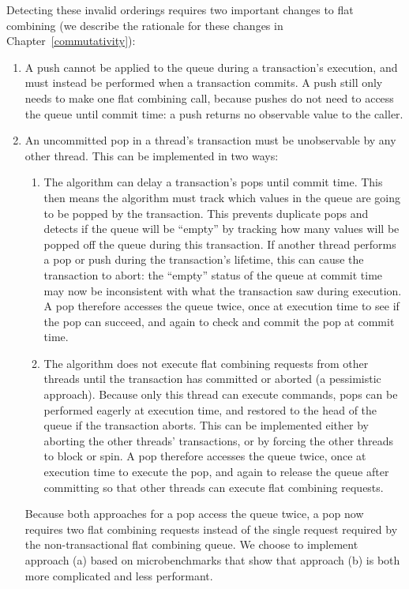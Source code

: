 Detecting these invalid orderings requires two important changes to flat combining (we describe the rationale for these changes in Chapter~\ref{commutativity}): 
\begin{enumerate}
    \item A push cannot be applied to the queue during a transaction's execution, and must instead be performed when a transaction commits. A push still only needs to make one flat combining call, because pushes do not need to access the queue until commit time: a push returns no observable value to the caller.
\item An uncommitted pop in a thread's transaction must be unobservable by any other thread. This can be implemented in two ways:  
    \begin{enumerate}
        \item The algorithm can delay a transaction's pops until commit time. This then means the algorithm must track which values in the queue are going to be popped by the transaction. This prevents duplicate pops and detects if the queue will be ``empty'' by tracking how many values will be popped off the queue during this transaction. If another thread performs a pop or push during the transaction's lifetime, this can cause the transaction to abort: the ``empty'' status of the queue at commit time may now be inconsistent with what the transaction saw during execution. 
        A pop therefore accesses the queue twice, once at execution time to see if the pop can succeed, and again to check and commit the pop at commit time. 
        \item The algorithm does not execute flat combining requests from other threads until the transaction has committed or aborted (a pessimistic approach). Because only this thread can execute commands, pops can be performed eagerly at execution time, and restored to the head of the queue if the transaction aborts. This can be implemented either by aborting the other threads' transactions, or by forcing the other threads to block or spin.
        A pop therefore accesses the queue twice, once at execution time to execute the pop, and again to release the queue after committing so that other threads can execute flat combining requests.
    \end{enumerate}

        Because both approaches for a pop access the queue twice, a pop now requires two flat combining requests instead of the single request required by the non-transactional flat combining queue.
        We choose to implement approach (a) based on microbenchmarks that show that approach (b) is both more complicated and less performant.

\end{enumerate}


